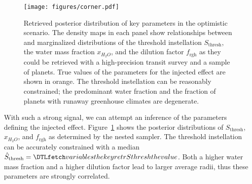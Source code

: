 \documentclass[twocolumn,twocolappendix]{aastex631}
\begin{document}
\begin{figure}[ht!]
    \begin{centering}
        \texttt{[image: figures/corner.pdf]}
        \caption{
            Retrieved posterior distribution of key parameters in the optimistic scenario. The density maps in each panel show relationships between and marginalized distributions of the threshold instellation $S_\mathrm{thresh}$, the water mass fraction $x_{H_2O}$, and the dilution factor $f_\mathrm{rgh}$ as they could be retrieved with a high-precision transit survey and a sample of  planets. True values of the parameters for the injected effect are shown in orange. The threshold instellation can be reasonably constrained; the predominant water fraction and the fraction of planets with runaway greenhouse climates are degenerate.
        }
        \label{fig:cornerplot}
    \end{centering}
\end{figure}
With such a strong signal, we can attempt an inference of the parameters defining the injected effect.
Figure~\ref{fig:cornerplot} shows the posterior distributions of $S_\mathrm{thresh}$, $x_{H_2O}$, and $f_\mathrm{rgh}$ as determined by the nested sampler.
The threshold instellation can be accurately constrained with a median $\hat{S}_\mathrm{thresh} = \var{retrSthresh}$.
Both a higher water mass fraction and a higher dilution factor lead to larger average radii, thus these parameters are strongly correlated.
\end{document}
